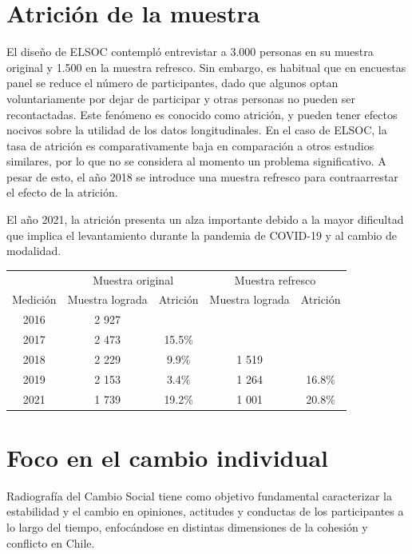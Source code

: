 \documentclass[
  12pt,
  openany]{book}
\begin{document}
\hypertarget{atriciuxf3n-de-la-muestra}{%
\chapter{Atrición de la muestra}\label{atriciuxf3n-de-la-muestra}}

El diseño de ELSOC contempló entrevistar a 3.000 personas en su muestra original y 1.500 en la muestra refresco. Sin embargo, es habitual que en encuestas panel se reduce el número de participantes, dado que algunos optan voluntariamente por dejar de participar y otras personas no pueden ser recontactadas. Este fenómeno es conocido como atrición, y pueden tener efectos nocivos sobre la utilidad de los datos longitudinales. En el caso de ELSOC, la tasa de atrición es comparativamente baja en comparación a otros estudios similares, por lo que no se considera al momento un problema significativo. A pesar de esto, el año 2018 se introduce una muestra refresco para contraarrestar el efecto de la atrición.

El año 2021, la atrición presenta un alza importante debido a la mayor dificultad que implica el levantamiento durante la pandemia de COVID-19 y al cambio de modalidad.

\begin{table}
\centering
\begin{tabular}[t]{c|c|c|c|c}
\hline
\multicolumn{1}{c|}{ } & \multicolumn{2}{c|}{Muestra original} & \multicolumn{2}{c}{Muestra refresco} \\
\cline{2-3} \cline{4-5}
Medición & Muestra lograda & Atrición & Muestra lograda & Atrición\\
\hline
2016 & 2 927 &  &  & \\
\hline
2017 & 2 473 & 15.5\% &  & \\
\hline
2018 & 2 229 & 9.9\% & 1 519 & \\
\hline
2019 & 2 153 & 3.4\% & 1 264 & 16.8\%\\
\hline
2021 & 1 739 & 19.2\% & 1 001 & 20.8\%\\
\hline
\end{tabular}
\end{table}

\hypertarget{foco-en-el-cambio-individual}{%
\chapter{Foco en el cambio individual}\label{foco-en-el-cambio-individual}}

Radiografía del Cambio Social tiene como objetivo fundamental caracterizar la estabilidad y el cambio en opiniones, actitudes y conductas de los participantes a lo largo del tiempo, enfocándose en distintas dimensiones de la cohesión y conflicto en Chile.
\end{document}
